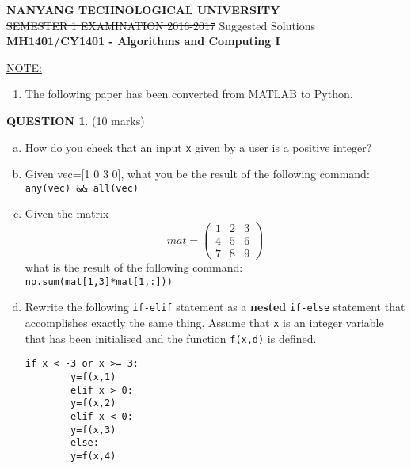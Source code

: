 \documentclass[a4paper,12pt]{article}
\theoremstyle{definition}
\newtheorem{ques}[dummy]{QUESTION}
\theoremstyle{plain}
\begin{document}
	\begin{titlepage}
		\begin{center}
			\textbf{NANYANG TECHNOLOGICAL UNIVERSITY}\\\vspace{1em}\sout{SEMESTER 1 EXAMINATION 2016-2017} Suggested Solutions\\\vspace{1em}
			\textbf{MH1401/CY1401 - Algorithms and Computing I}
		\end{center}
				\vspace{5em}
	\underline{NOTE:}
	\begin{enumerate}
		\item The following paper has been converted from MATLAB to Python.
	\end{enumerate}
	\vfill
	\end{titlepage}


	\tableofcontents
	\newpage

\begin{ques}\hfill (10 marks)\\
	\begin{enumerate}[(a)]
		\item How do you check that an input \texttt{x} given by a user is a positive integer?
		\item Given vec=[1 0 3 0], what you be the result of the following command:\\\texttt{any(vec) \&\& all(vec)}
		\item Given the matrix\begin{equation*}
		mat = \begin{pmatrix*}
		1 & 2 & 3\\4 & 5 & 6\\7 & 8 & 9
		\end{pmatrix*}
		\end{equation*}
		what is the result of the following command:\\
		\texttt{np.sum(mat[1,3]*mat[1,:]))}
		\item Rewrite the following \texttt{if-elif} statement as a \textbf{nested} \texttt{if-else} statement that accomplishes exactly the same thing. Assume that \texttt{x} is an integer variable that has been initialised and the function \texttt{f(x,d)} is defined.\begin{verbatim}if x < -3 or x >= 3:
		y=f(x,1)
		elif x > 0:
		y=f(x,2)
		elif x < 0:
		y=f(x,3)
		else:
		y=f(x,4)
		\end{verbatim}
	\end{enumerate}
\end{ques}
\end{document}
